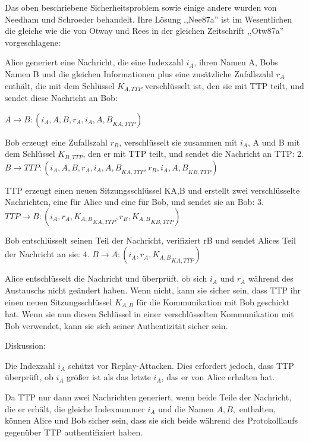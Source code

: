 \documentclass[a4paper]{article}
\begin{document}
\begin{multicols}{3}
      \begin{itemize*}
            \item Das oben beschriebene Sicherheitsproblem sowie einige andere wurden
            von Needham und Schroeder behandelt. Ihre Lösung ,,Nee87a'' ist im
            Wesentlichen die gleiche wie die von Otway und Rees in der gleichen
            Zeitschrift ,,Otw87a'' vorgeschlagene:
            \begin{itemize*}
                  \item Alice generiert eine Nachricht, die eine Indexzahl $i_A$, ihren Namen A, Bobs Namen B und die gleichen Informationen plus eine zusätzliche Zufallszahl $r_A$ enthält, die mit dem Schlüssel $K_{A,TTP}$ verschlüsselt ist, den sie mit TTP teilt, und sendet diese Nachricht an Bob:
                  \begin{enumerate*} \def\labelenumi{\arabic{enumi}.} \item $A\rightarrow B:(i_A, A, B,{r_A, i_A, A, B}_{{K}{A,TTP}})$ \end{enumerate*}
                  \item Bob erzeugt eine Zufallszahl $r_B$, verschlüsselt sie zusammen mit $i_A$, A und B mit dem Schlüssel $K_{B,TTP}$, den er mit TTP teilt, und sendet die Nachricht an TTP: 2. $B\rightarrow TTP:(i_A, A, B,{r_A,i_A,A,B}_{{K}{A,TTP}},{r_B,i_A,A,B}_{{K}{B,TTP}})$
                  \item TTP erzeugt einen neuen Sitzungsschlüssel KA,B und erstellt zwei verschlüsselte Nachrichten, eine für Alice und eine für Bob, und sendet sie an Bob: 3. $TTP\rightarrow B:(i_A,{r_A,K_{A,B}}_{{K}{A,TTP}},{r_B, K_{A,B}}_{{K}{B,TTP}})$
                  \item Bob entschlüsselt seinen Teil der Nachricht, verifiziert rB und sendet Alices Teil der Nachricht an sie: 4. $B\rightarrow A:(i_A,{r_A,K_{A,B}}_{{K}{A,TTP}})$
                  \item Alice entschlüsselt die Nachricht und überprüft, ob sich $i_A$ und $r_A$ während des Austauschs nicht geändert haben. Wenn nicht, kann sie sicher sein, dass TTP ihr einen neuen Sitzungsschlüssel $K_{A,B}$ für die Kommunikation mit Bob geschickt hat. Wenn sie nun diesen Schlüssel in einer verschlüsselten Kommunikation mit Bob verwendet, kann sie sich seiner Authentizität sicher sein.
            \end{itemize*}
            \item Diskussion:
            \begin{itemize*}
                  \item Die Indexzahl $i_A$ schützt vor Replay-Attacken. Dies erfordert jedoch, dass TTP überprüft, ob $i_A$ größer ist als das letzte $i_A$, das er von Alice erhalten hat.
                  \item Da TTP nur dann zwei Nachrichten generiert, wenn beide Teile der Nachricht, die er erhält, die gleiche Indexnummer $i_A$ und die Namen $A, B,$ enthalten, können Alice und Bob sicher sein, dass sie sich beide während des Protokolllaufs gegenüber TTP authentifiziert haben.
            \end{itemize*}
      \end{itemize*}



\end{multicols}
\end{document}
